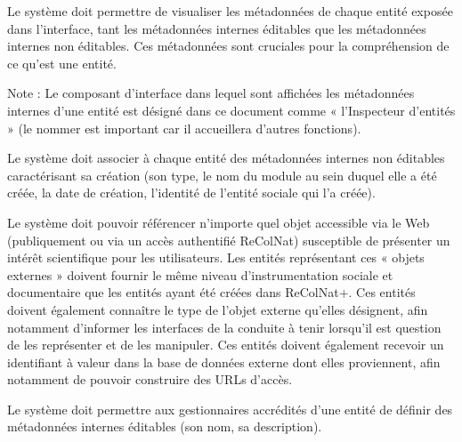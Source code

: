 \startsubsection[title={Métadonnées internes}]

\exig{}
Le système doit permettre de visualiser les métadonnées de chaque entité exposée dans l'interface, tant les métadonnées internes éditables que les métadonnées internes non éditables.
Ces métadonnées sont cruciales pour la compréhension de ce qu'est une entité.

Note :
Le composant d'interface dans lequel sont affichées les métadonnées internes d'une entité est désigné dans ce document comme « l'Inspecteur d'entités » (le nommer est important car il accueillera d'autres fonctions).

\startsubsubsection[title={Métadonnées internes non éditables}]

\exig{}
Le système doit associer à chaque entité des métadonnées internes non éditables caractérisant sa création (son type, le nom du module au sein duquel elle a été créée, la date de création, l'identité de l'entité sociale qui l'a créée).

\exig{}
Le système doit pouvoir référencer n'importe quel objet accessible via le Web (publiquement ou via un accès authentifié ReColNat) susceptible de présenter un intérêt scientifique pour les utilisateurs.
Les entités représentant ces « objets externes » doivent fournir le même niveau d'instrumentation sociale et documentaire que les entités ayant été créées dans ReColNat+.
Ces entités doivent également connaître le type de l'objet externe qu'elles désignent, afin notamment d'informer les interfaces de la conduite à tenir lorsqu'il est question de les représenter et de les manipuler.
Ces entités doivent également recevoir un identifiant à valeur dans la base de données externe dont elles proviennent, afin notamment de pouvoir construire des URLs d'accès.

\startsubsubsection[title={Métadonnées internes éditables}]

\exig{}
Le système doit permettre aux gestionnaires accrédités d'une entité de définir des métadonnées internes éditables (son nom, sa description).

\startsection[title={Éléments de modélisation}]


